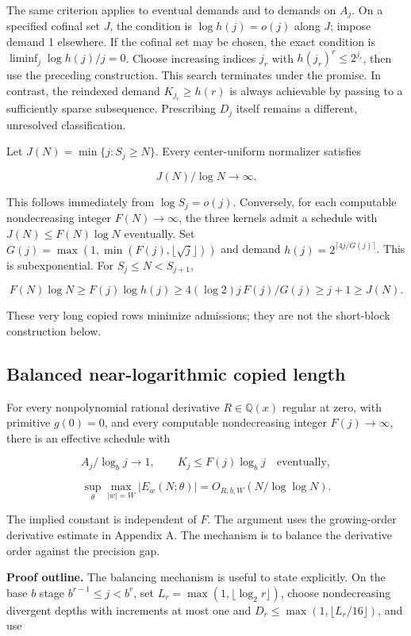 \documentclass[11pt,a4paper]{article}
\begin{document}
The same criterion applies to eventual demands and to demands on
\(A_j\). On a specified cofinal set \(J\), the condition is
\(\log h(j)=o(j)\) along \(J\); impose demand 1 elsewhere. If the
cofinal set may be chosen, the exact condition is
\(\liminf_j\log h(j)/j=0\). Choose increasing indices \(j_r\) with
\(h(j_r)^r\le2^{j_r}\), then use the preceding construction. This search
terminates under the promise. In contrast, the reindexed demand
\(K_{j_r}\ge h(r)\) is always achievable by passing to a sufficiently
sparse subsequence. Prescribing \(D_j\) itself remains a different,
unresolved classification.

Let \(J(N)=\min\lbrace j:S_j\ge N\rbrace\). Every center-uniform
normalizer satisfies

\[
J(N)/\log N\to\infty.
\tag{R5}
\]

This follows immediately from \(\log S_j=o(j)\). Conversely, for each
computable nondecreasing integer \(F(N)\to\infty\), the three kernels
admit a schedule with \(J(N)\le F(N)\log N\) eventually. Set
\(G(j)=\max(1,\min(F(j),\lfloor\sqrt j\rfloor))\) and demand
\(h(j)=2^{\lceil4j/G(j)\rceil}\). This is subexponential. For
\(S_j\le N< S_{j+1}\),

\[
F(N)\log N\ge F(j)\log h(j)
 \ge4(\log2)j\,F(j)/G(j)\ge j+1\ge J(N).
\]

These very long copied rows minimize admissions; they are not the
short-block construction below.

\subsection{Balanced near-logarithmic copied
length}\label{balanced-near-logarithmic-copied-length}

For every nonpolynomial rational derivative \(R\in\mathbb Q(x)\) regular
at zero, with primitive \(g(0)=0\), and every computable nondecreasing
integer \(F(j)\to\infty\), there is an effective schedule with

\[
A_j/\log_bj\to1,\qquad K_j\le F(j)\log_bj
\quad\text{eventually},
\]

\[
\sup_\theta\max_{|w|=W}|E_w(N;\theta)|
       =O_{R,b,W}(N/\log\log N).
\tag{R6}
\]

The implied constant is independent of \(F\). The argument uses the
growing-order derivative estimate in Appendix A. The mechanism is to
balance the derivative order against the precision gap.

\textbf{Proof outline.} The balancing mechanism is useful to state
explicitly. On the base \(b\) stage \(b^{r-1}\le j< b^r\), set
\(L_r=\max(1,\lfloor\log_2r\rfloor)\), choose nondecreasing divergent
depths with increments at most one and
\(D_r\le\max(1,\lfloor L_r/16\rfloor)\), and use
\end{document}
